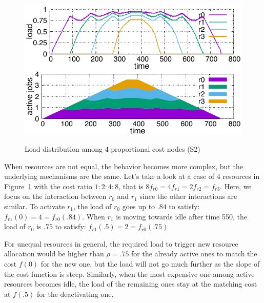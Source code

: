 \begin{figure}
  \begin{center}
    \includegraphics[width=1.0\columnwidth]{4node-ratio.pdf}
    \vspace{-2.0ex}
    \caption{Load distribution among 4 proportional cost nodes (S2)}
    \label{fig:4node-ratio}
  \end{center}
\end{figure}

When resources are not equal, the behavior becomes more complex, but
the underlying mechanisms are the same.
Let's take a look at a case of 4 resources in Figure~\ref{fig:4node-ratio}
with the cost ratio $1:2:4:8$,
that is $8 f_{r0} = 4 f_{r1} = 2 f_{r2} = f_{r3}$.
Here, we focus on the interaction between $r_{0}$ and $r_{1}$ since
the other interactions are similar.
To activate $r_{1}$, the load of $r_{0}$ goes up to $.84$ to satisfy:
$f_{r1}(0) = 4 = f_{r0}(.84)$.
When $r_{1}$ is moving towards idle after time 550, the load
of $r_{0}$ is $.75$ to satisfy: $f_{r1}(.5) = 2 = f_{r0}(.75)$

For unequal resources in general, the required load to trigger new
resource allocation would be higher than $\rho = .75$ for the already
active ones to match the cost $f(0)$ for the new one, but the load
will not go much further as the slope of the cost function is steep.
Similarly, when the most expensive one among active resources becomes
idle, the load of the remaining ones stay at the matching cost at
$f(.5)$ for the deactivating one.


